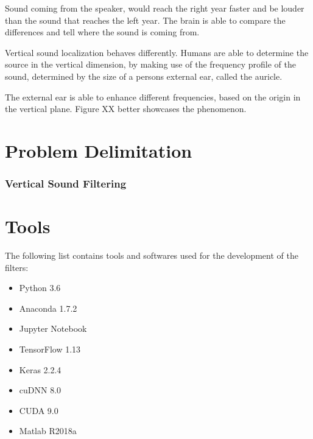 Sound coming from the speaker, would reach  the right year faster and be louder than 
the sound that reaches the left year. The brain is able to compare the differences
and tell where the sound is coming from.

Vertical sound localization behaves differently. Humans are able to determine the source
in the vertical dimension, by making use of the frequency profile of the sound, determined
by the size of a persons external ear, called the auricle.

The external ear is able to enhance different frequencies, based on the origin in the vertical
plane. Figure XX better showcases the phenomenon.


\section{Problem Delimitation}
\subsubsection{Vertical Sound Filtering}
\section{Tools}
The following list contains tools and softwares used for the development of the filters:
\begin{itemize}
\item Python 3.6
\item Anaconda 1.7.2
\item Jupyter Notebook
\item TensorFlow 1.13
\item Keras 2.2.4
\item cuDNN 8.0
\item CUDA 9.0
\item Matlab R2018a
\end{itemize}
